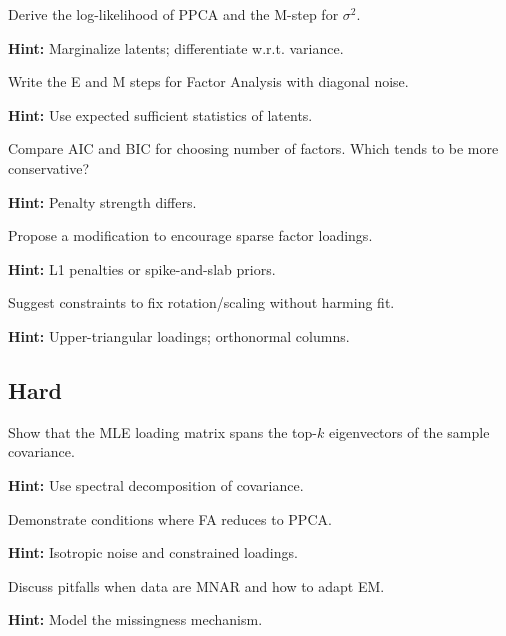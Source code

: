 \begin{problem}
Derive the log-likelihood of PPCA and the M-step for $\sigma^2$.

\textbf{Hint:} Marginalize latents; differentiate w.r.t. variance.
\end{problem}

\begin{problem}[EM for FA]
Write the E and M steps for Factor Analysis with diagonal noise.

\textbf{Hint:} Use expected sufficient statistics of latents.
\end{problem}

\begin{problem}
Compare AIC and BIC for choosing number of factors. Which tends to be more conservative?

\textbf{Hint:} Penalty strength differs.
\end{problem}

\begin{problem}
Propose a modification to encourage sparse factor loadings.

\textbf{Hint:} L1 penalties or spike-and-slab priors.
\end{problem}

\begin{problem}
Suggest constraints to fix rotation/scaling without harming fit.

\textbf{Hint:} Upper-triangular loadings; orthonormal columns.
\end{problem}

\subsection*{Hard}

\begin{problem}
Show that the MLE loading matrix spans the top-$k$ eigenvectors of the sample covariance.

\textbf{Hint:} Use spectral decomposition of covariance.
\end{problem}

\begin{problem}[FA vs. PPCA]
Demonstrate conditions where FA reduces to PPCA.

\textbf{Hint:} Isotropic noise and constrained loadings.
\end{problem}

\begin{problem}
Discuss pitfalls when data are MNAR and how to adapt EM.

\textbf{Hint:} Model the missingness mechanism.
\end{problem}

